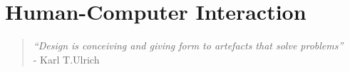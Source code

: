 \section{Human-Computer Interaction}
\label{sec:hcitheory}
\begin{quotation}
 \textit{``Design is conceiving and giving form to artefacts that solve problems''} \\
 - Karl T.Ulrich
\end{quotation}
 


